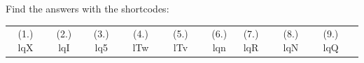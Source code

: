     



  \label{m38776**end}
          
       
    
  \label{f13bac5321b85aca0e213ebdf4f72465**end}
    
\par {} Find the answers with the shortcodes:
 \par \begin{tabular}[h]{cccccc}
 (1.) lqX  &  (2.) lqI  &  (3.) lq5  &  (4.) lTw  &  (5.) lTv  &  (6.) lqn  &  (7.) lqR  &  (8.) lqN  &  (9.) lqQ  & \end{tabular}



